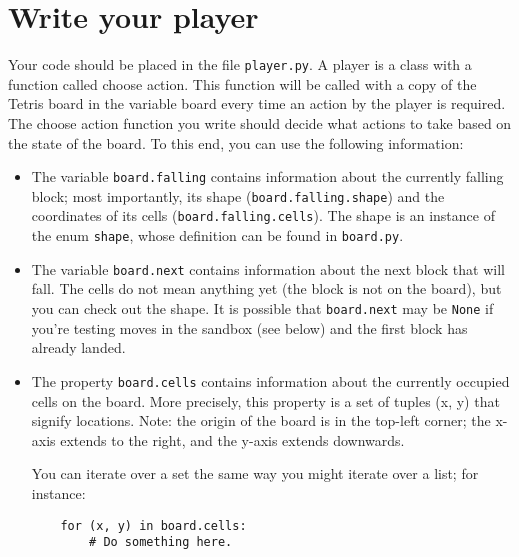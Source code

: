 \documentclass{article}
\begin{document}
\section{Write your player}
Your code should be placed in the file \texttt{player.py}. A player is a class with a function called choose action. This function will be called with a copy of the Tetris board in the variable board every time an action by the player is required. The choose action function you write should decide what actions to take based on the state of the board. To this end, you can use the following information:
\begin{itemize}
\item The variable \texttt{board.falling} contains information about the currently falling block; most importantly, its shape (\texttt{board.falling.shape}) and the coordinates of its cells (\texttt{board.falling.cells}). The shape is an instance of the enum \texttt{shape}, whose definition can be found in \texttt{board.py}.
\item The variable \texttt{board.next} contains information about the
  next block that will fall. The cells do not mean anything yet (the
  block is not on the board), but you can check out the shape. It is
  possible that \texttt{board.next} may be \texttt{None} if you’re testing moves in the
  sandbox (see below) and the first block has already landed.  
\item The property \texttt{board.cells} contains information about the
  currently occupied cells on the board. More precisely, this property
  is a set of tuples (x, y) that signify locations. Note: the origin
  of the board is in the top-left corner; the x-axis extends to the
  right, and the y-axis extends downwards.

You can iterate over a set the same way you might iterate over a list; for instance:
\begin{verbatim}  
    for (x, y) in board.cells:
        # Do something here.
\end{verbatim}


\end{itemize}
\end{document}
